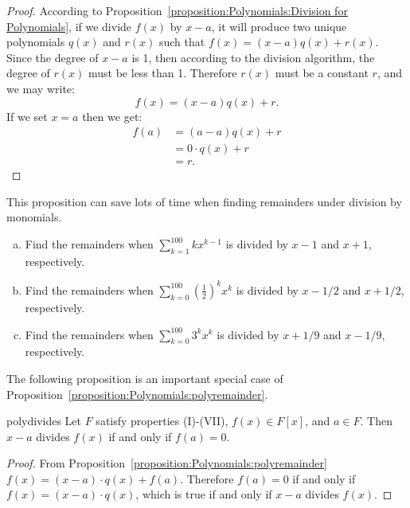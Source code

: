 \begin{proof}
According to Proposition~\ref{proposition:Polynomials:Division for Polynomials}, if we divide $f(x)$ by $x-a$, it will produce two unique polynomials $q(x)$ and $r(x)$ such that $f(x) = (x-a)q(x) + r(x)$.  Since the degree of $x-a$ is 1, then according to the division algorithm, the degree of $r(x)$ must be less than 1.  Therefore $r(x)$ must be a constant $r$, and we may write:
\[f(x) = (x-a)q(x) + r.\]
If we set $x=a$ then we get:
\begin{align*}
f(a) &= (a-a)q(x) + r\\
& = 0 \cdot q(x) + r \\
& = r.
\end{align*}
\end {proof}

This proposition can save lots of time when finding remainders under division by monomials.

\begin{exercise}{}
\begin{enumerate}[(a)]
\item
Find the remainders when $\sum_{k=1}^{100} k x^{k-1}$ is divided by $x-1$ and  $x+1$, respectively.
\item
Find the remainders when $\sum_{k=0}^{100} \left( \frac{1}{2} \right)^k x^k$ is divided by $x-1/2$ and $x+1/2$, respectively.
\item
Find the remainders when $\sum_{k=0}^{100} 3^k x^{k}$ is divided by $x+1/9$ and $x - 1/9$, respectively.
\end{enumerate}
\end{exercise}

The following proposition is an important special case of Proposition~\ref{proposition:Polynomials:polyremainder}.

\begin{prop}{polydivides}
Let $F$ satisfy properties (I)-(VII), $f(x) \in F[x]$, and $a \in F$.  Then $x-a$ divides $f(x)$ if and only if $f(a) = 0$.
\end {prop}

\begin{proof}
From Proposition~\ref{proposition:Polynomials:polyremainder} $f(x) = (x-a) \cdot q(x) + f(a)$. Therefore $f(a) = 0$ if and only if $f(x)=(x-a) \cdot q(x)$, which is true if and only if $x-a$ divides $f(x)$.
\end{proof}

